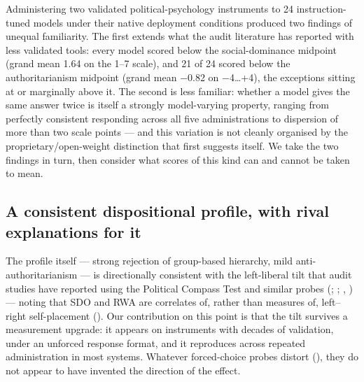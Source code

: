 \documentclass[
]{article}
\begin{document}
Administering two validated political-psychology instruments to 24
instruction-tuned models under their native deployment conditions
produced two findings of unequal familiarity. The first extends what the
audit literature has reported with less validated tools: every model
scored below the social-dominance midpoint (grand mean 1.64 on the 1--7
scale), and 21 of 24 scored below the authoritarianism midpoint (grand
mean −0.82 on −4\ldots+4), the exceptions sitting at or marginally above
it. The second is less familiar: whether a model gives the same answer
twice is itself a strongly model-varying property, ranging from
perfectly consistent responding across all five administrations to
dispersion of more than two scale points --- and this variation is not
cleanly organised by the proprietary/open-weight distinction that first
suggests itself. We take the two findings in turn, then consider what
scores of this kind can and cannot be taken to mean.

\subsection{A consistent dispositional profile, with rival explanations
for
it}\label{a-consistent-dispositional-profile-with-rival-explanations-for-it}

The profile itself --- strong rejection of group-based hierarchy, mild
anti-authoritarianism --- is directionally consistent with the
left-liberal tilt that audit studies have reported using the Political
Compass Test and similar probes (; ;
,
) --- noting that SDO and RWA are
correlates of, rather than measures of, left--right self-placement
(). Our contribution on this
point is that the tilt survives a measurement upgrade: it appears on
instruments with decades of validation, under an unforced response
format, and it reproduces across repeated administration in most
systems. Whatever forced-choice probes distort
(), they do not appear
to have invented the direction of the effect.
\end{document}
